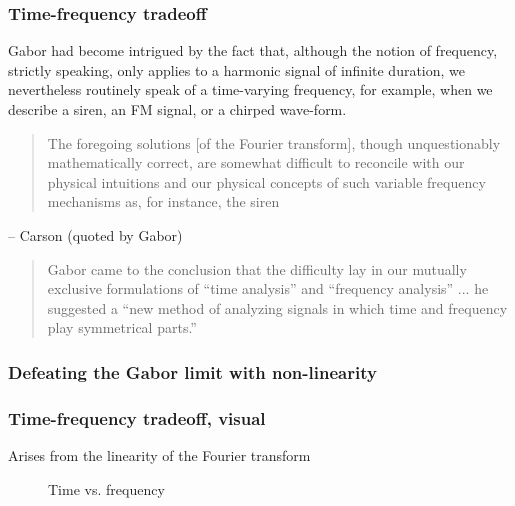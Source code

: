 \documentclass{beamer}
\begin{document}
\begin{frame}
	\frametitle{Time-frequency tradeoff}
	Gabor had become intrigued by the fact that, although the notion of frequency, strictly speaking, only applies to a harmonic signal of infinite duration, we nevertheless routinely speak of a time-varying frequency, for example, when we describe a siren, an FM signal, or a chirped wave-form.
	\begin{quote}
		The foregoing solutions [of the Fourier transform], though unquestionably mathematically correct, are somewhat difficult to reconcile with our physical intuitions and our physical concepts of such variable frequency mechanisms as, for instance, the siren
	\end{quote}
	-- Carson (quoted by Gabor)
	\begin{quote}
		Gabor came to the conclusion that the difficulty lay in our mutually exclusive formulations of ``time analysis'' and ``frequency analysis'' ... he suggested a ``new method of analyzing signals in which time and frequency play symmetrical parts.''
	\end{quote}
\end{frame}


\begin{frame}
	\frametitle{Defeating the Gabor limit with non-linearity}
	
\end{frame}

\begin{frame}
	\frametitle{Time-frequency tradeoff, visual}
	Arises from the linearity of the Fourier transform
	\begin{figure}
		\centering
		\hspace{0.2em}
		\caption{Time vs. frequency}
	\end{figure}
\end{frame}
\end{document}
